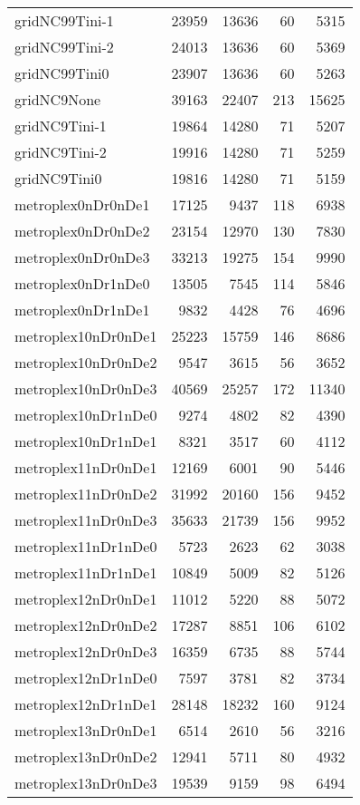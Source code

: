 \begin{longtable}{lrrrr}
gridNC99Tini-1 & 23959 & 13636 & 60 & 5315 \\
gridNC99Tini-2 & 24013 & 13636 & 60 & 5369 \\
gridNC99Tini0 & 23907 & 13636 & 60 & 5263 \\
gridNC9None & 39163 & 22407 & 213 & 15625 \\
gridNC9Tini-1 & 19864 & 14280 & 71 & 5207 \\
gridNC9Tini-2 & 19916 & 14280 & 71 & 5259 \\
gridNC9Tini0 & 19816 & 14280 & 71 & 5159 \\
metroplex0nDr0nDe1 & 17125 & 9437 & 118 & 6938 \\
metroplex0nDr0nDe2 & 23154 & 12970 & 130 & 7830 \\
metroplex0nDr0nDe3 & 33213 & 19275 & 154 & 9990 \\
metroplex0nDr1nDe0 & 13505 & 7545 & 114 & 5846 \\
metroplex0nDr1nDe1 & 9832 & 4428 & 76 & 4696 \\
metroplex10nDr0nDe1 & 25223 & 15759 & 146 & 8686 \\
metroplex10nDr0nDe2 & 9547 & 3615 & 56 & 3652 \\
metroplex10nDr0nDe3 & 40569 & 25257 & 172 & 11340 \\
metroplex10nDr1nDe0 & 9274 & 4802 & 82 & 4390 \\
metroplex10nDr1nDe1 & 8321 & 3517 & 60 & 4112 \\
metroplex11nDr0nDe1 & 12169 & 6001 & 90 & 5446 \\
metroplex11nDr0nDe2 & 31992 & 20160 & 156 & 9452 \\
metroplex11nDr0nDe3 & 35633 & 21739 & 156 & 9952 \\
metroplex11nDr1nDe0 & 5723 & 2623 & 62 & 3038 \\
metroplex11nDr1nDe1 & 10849 & 5009 & 82 & 5126 \\
metroplex12nDr0nDe1 & 11012 & 5220 & 88 & 5072 \\
metroplex12nDr0nDe2 & 17287 & 8851 & 106 & 6102 \\
metroplex12nDr0nDe3 & 16359 & 6735 & 88 & 5744 \\
metroplex12nDr1nDe0 & 7597 & 3781 & 82 & 3734 \\
metroplex12nDr1nDe1 & 28148 & 18232 & 160 & 9124 \\
metroplex13nDr0nDe1 & 6514 & 2610 & 56 & 3216 \\
metroplex13nDr0nDe2 & 12941 & 5711 & 80 & 4932 \\
metroplex13nDr0nDe3 & 19539 & 9159 & 98 & 6494 \\

\end{longtable}
